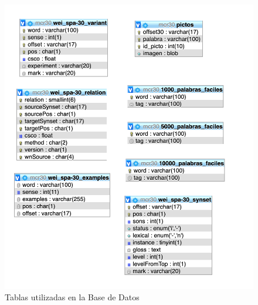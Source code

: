 \begin{figure}[!h]
	\includegraphics[width=.9\textwidth]{Imagenes/Bitmap/Capitulo4/tablasBBDD.png}
	\caption{Tablas utilizadas en la Base de Datos}
	\label{fig:tablasBBDD}
\end{figure}


